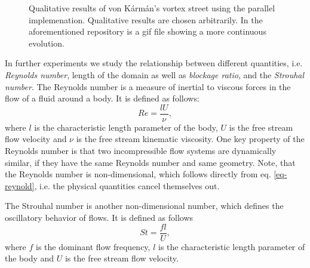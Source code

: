 \documentclass[a4paper,11pt, footsepline]{book}
\begin{document}
\begin{figure}
\begin{center}
            
   \caption{Qualitative results of von K\'{a}rm\'{a}n's vortex street using the parallel implemenation. Qualitative results are chosen arbitrarily. In the aforementioned repository is a gif file showing a more continuous evolution.}
  \label{fig:vonKarmanQualitative}
  \end{center}
\end{figure}

In further experiments we study the relationship between different quantities, i.e. \textit{Reynolds number}, length of the domain as well as \textit{blockage ratio}, and the \textit{Strouhal number}.
The Reynolds number is a measure of inertial to viscous forces in the flow of a fluid around a body. It is defined as follows:
\begin{equation}
\label{eq-reynold}
Re=\frac{lU}{\nu},
\end{equation}
where $l$ is the characteristic length parameter of the body, $U$ is the free stream flow velocity and $\nu$ is the free stream kinematic viscosity. One key property of the Reynolds number is that two incompressible flow systems are dynamically similar, if they have the same Reynolds number and same geometry. Note, that the Reynolds number is non-dimensional, which follows directly from eq. \ref{eq-reynold}, i.e. the physical quantities cancel themselves out.

The Strouhal number is another non-dimensional number, which defines the oscillatory behavior of flows. It is defined as follows
\begin{equation}
\label{eq-strouhal}
St=\frac{fl}{U},
\end{equation}
where $f$ is the dominant flow frequency, $l$ is the characteristic length parameter of the body and $U$ is the free stream flow velocity.
\end{document}
